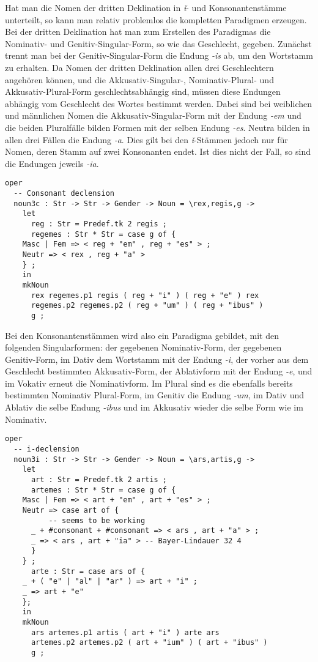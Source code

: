 Hat man die Nomen der dritten Deklination in \textit{ǐ}- und Konsonantenstämme unterteilt, so kann man relativ problemlos die kompletten Paradigmen erzeugen. Bei der dritten Deklination hat man zum Erstellen des Paradigmas die Nominativ- und Genitiv-Singular-Form, so wie das Geschlecht, gegeben. Zunächst trennt man bei der Genitiv-Singular-Form die Endung \textit{-is} ab, um den Wortstamm zu erhalten. Da Nomen der dritten Deklination allen drei Geschlechtern angehören können, und die Akkusativ-Singular-, Nominativ-Plural- und Akkusativ-Plural-Form geschlechtsabhängig sind, müssen diese Endungen abhängig vom Geschlecht des Wortes bestimmt werden. Dabei sind bei weiblichen und männlichen Nomen die Akkusativ-Singular-Form mit der Endung \textit{-em} und die beiden Pluralfälle bilden Formen mit der selben Endung \textit{-es}. Neutra bilden in allen drei Fällen die Endung \textit{-a}. Dies gilt bei den \textit{ǐ}-Stämmen jedoch nur für Nomen, deren Stamm auf zwei Konsonanten endet. Ist dies nicht der Fall, so sind die Endungen jeweils \textit{-ia}. \par
\begin{lstlisting}[float=h!tp,caption={Die Deklinationsfunktionen für die Nomen der dritten Deklination der Konsonantenstämme (vgl. \textbf{MorphoLat.gf})},label={GF-Morpho-Noun3c},basicstyle=\small]
oper
  -- Consonant declension
  noun3c : Str -> Str -> Gender -> Noun = \rex,regis,g ->
    let
      reg : Str = Predef.tk 2 regis ;
      regemes : Str * Str = case g of {
	Masc | Fem => < reg + "em" , reg + "es" > ;
	Neutr => < rex , reg + "a" > 
	} ;
    in
    mkNoun
      rex regemes.p1 regis ( reg + "i" ) ( reg + "e" ) rex
      regemes.p2 regemes.p2 ( reg + "um" ) ( reg + "ibus" ) 
      g ;
\end{lstlisting}
Bei den Konsonantenstämmen wird also ein Paradigma gebildet, mit den folgenden Singularformen: der gegebenen Nominativ-Form, der gegebenen Genitiv-Form, im Dativ dem Wortstamm mit der Endung \textit{-i}, der vorher aus dem Geschlecht bestimmten Akkusativ-Form, der Ablativform mit der Endung \textit{-e}, und im Vokativ erneut die Nominativform. Im Plural sind es die ebenfalls bereits bestimmten Nominativ Plural-Form, im Genitiv die Endung \textit{-um}, im Dativ und Ablativ die selbe Endung \textit{-ibus} und im Akkusativ wieder die selbe Form wie im Nominativ. \par
\begin{lstlisting}[float=h!tp,caption={Die Deklinationsfunktionen für die Nomen der dritten Deklination der \textit{ǐ}-Stämme (vgl. \textbf{MorphoLat.gf})},label={GF-Morpho-Noun3i},basicstyle=\small]
oper
  -- i-declension
  noun3i : Str -> Str -> Gender -> Noun = \ars,artis,g ->
    let 
      art : Str = Predef.tk 2 artis ;
      artemes : Str * Str = case g of {
	Masc | Fem => < art + "em" , art + "es" > ;
	Neutr => case art of {
          -- seems to be working
	  _ + #consonant + #consonant => < ars , art + "a" > ; 
	  _ => < ars , art + "ia" > -- Bayer-Lindauer 32 4
	  }
	} ;
      arte : Str = case ars of {
	_ + ( "e" | "al" | "ar" ) => art + "i" ;
	_ => art + "e"
	};
    in
    mkNoun
      ars artemes.p1 artis ( art + "i" ) arte ars
      artemes.p2 artemes.p2 ( art + "ium" ) ( art + "ibus" ) 
      g ;
\end{lstlisting}
